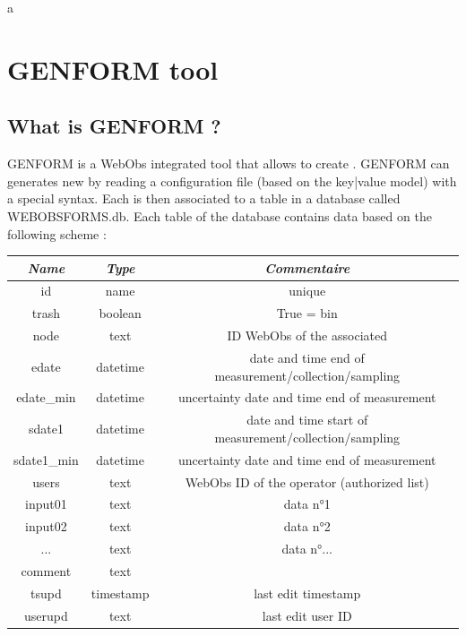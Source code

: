 
a\chapter{GENFORM tool} \label{metadata}



\section{What is GENFORM ?} \label{genform}

GENFORM is a WebObs integrated tool that allows to create . GENFORM can generates new  by reading a configuration file (based on the key|value model) with a special syntax. Each  is then associated to a table in a database called WEBOBSFORMS.db. Each table of the database contains data based on the following scheme :

\begin{center}
	\begin{tabular}{c c c}
		\hline
		\textit{Name} & \textit{Type} & \textit{Commentaire} \\
		\hline
		id & name & unique \\
		trash & boolean & True = bin	\\
		node & text & ID WebObs of the associated \wo{node} \\
		edate & datetime & date and time end of measurement/collection/sampling \\
		edate_min & datetime & uncertainty date and time end of measurement \\
		sdate1 & datetime & date and time start of measurement/collection/sampling \\
		sdate1_min & datetime & uncertainty date and time end of measurement \\
		users & text & WebObs ID of the operator (authorized list) \\
		input01 & text & data n°1 \\
		input02 & text & data n°2 \\
		... & text & data n°... \\
		comment & text \\
		tsupd & timestamp & last edit timestamp \\
		userupd & text & last edit user ID \\
		\hline
	\end{tabular}
\end{center}

